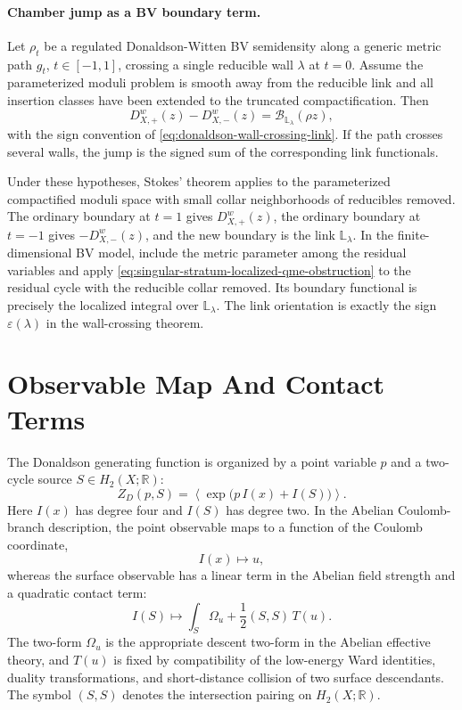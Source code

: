 \paragraph{Chamber jump as a BV boundary term.}
Let \(\rho_t\) be a regulated Donaldson-Witten BV semidensity along a generic
metric path \(g_t\), \(t\in[-1,1]\), crossing a single reducible wall
\(\lambda\) at \(t=0\).  Assume the parameterized moduli problem is smooth
away from the reducible link and all insertion classes have been extended to
the truncated compactification.  Then
\begin{equation}
  D_{X,+}^w(z)-D_{X,-}^w(z)
  =
  \mathcal B_{\mathbb L_\lambda}(\rho z),
  \label{eq:wall-crossing-bv-boundary}
\end{equation}
with the sign convention of
\eqref{eq:donaldson-wall-crossing-link}.  If the path crosses several walls,
the jump is the signed sum of the corresponding link functionals.

Under these hypotheses, Stokes' theorem applies to the parameterized
compactified moduli space with small collar neighborhoods of reducibles
removed.  The ordinary boundary at
\(t=1\) gives \(D_{X,+}^w(z)\), the ordinary boundary at \(t=-1\) gives
\(-D_{X,-}^w(z)\), and the new boundary is the link
\(\mathbb L_\lambda\).  In the finite-dimensional BV model, include the
metric parameter among the residual variables and apply
\eqref{eq:singular-stratum-localized-qme-obstruction} to the residual cycle
with the reducible collar removed.  Its boundary functional is precisely the
localized integral over \(\mathbb L_\lambda\).  The link orientation is
exactly the sign \(\varepsilon(\lambda)\) in the wall-crossing theorem.

\section{Observable Map And Contact Terms}

The Donaldson generating function is organized by a point variable \(p\) and
a two-cycle source \(S\in H_2(X;\mathbb R)\):
\[
  Z_D(p,S)
  =
  \left\langle
    \exp\bigl(p\,I(x)+I(S)\bigr)
  \right\rangle .
\]
Here \(I(x)\) has degree four and \(I(S)\) has degree two.  In the Abelian
Coulomb-branch description, the point observable maps to a function of the
Coulomb coordinate,
\[
  I(x)\longmapsto u ,
\]
whereas the surface observable has a linear term in the Abelian field strength
and a quadratic contact term:
\[
  I(S)\longmapsto
  \int_S \Omega_u
  +\frac{1}{2}(S,S)\,T(u).
\]
The two-form \(\Omega_u\) is the appropriate descent two-form in the Abelian
effective theory, and \(T(u)\) is fixed by compatibility of the low-energy
Ward identities, duality transformations, and short-distance collision of two
surface descendants.  The symbol \((S,S)\) denotes the intersection pairing
on \(H_2(X;\mathbb R)\).

